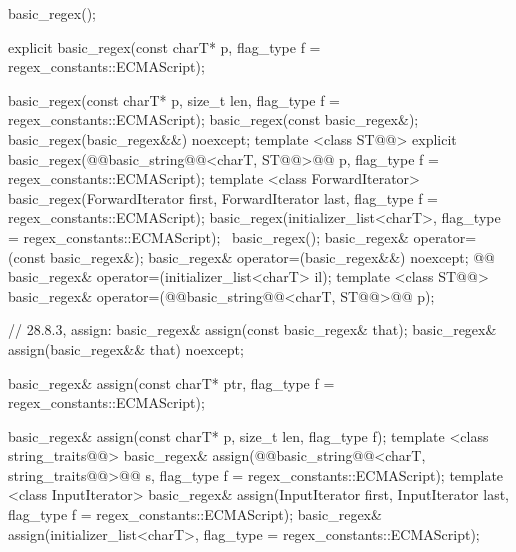 \documentclass[ebook,11pt,article]{memoir}
\begin{document}
\begin{codeblock}
    basic_regex();
\end{codeblock}
\begin{removedblock}
\begin{codeblock}
    explicit basic_regex(const charT* p,
      flag_type f = regex_constants::ECMAScript);
\end{codeblock}
\end{removedblock}
\begin{codeblock}                          
    basic_regex(const charT* p, size_t len, flag_type f = regex_constants::ECMAScript);
    basic_regex(const basic_regex&);
    basic_regex(basic_regex&&) noexcept;
    template <class ST@@>
      explicit basic_regex(@@basic_string@@<charT, ST@@>@\del{\&}@ p, 
                           flag_type f = regex_constants::ECMAScript);
    template <class ForwardIterator>
      basic_regex(ForwardIterator first, ForwardIterator last, 
                  flag_type f = regex_constants::ECMAScript);
    basic_regex(initializer_list<charT>,
      flag_type = regex_constants::ECMAScript);
    ~basic_regex();
    basic_regex& operator=(const basic_regex&);
    basic_regex& operator=(basic_regex&&) noexcept;
    @@
    basic_regex& operator=(initializer_list<charT> il);
    template <class ST@@>
      basic_regex& operator=(@@basic_string@@<charT, ST@@>@\del{\&}@ p);

    // 28.8.3, assign:
    basic_regex& assign(const basic_regex& that);
    basic_regex& assign(basic_regex&& that) noexcept;
\end{codeblock}
\begin{removedblock}
\begin{codeblock}
    basic_regex& assign(const charT* ptr,
      flag_type f = regex_constants::ECMAScript);
\end{codeblock}
\end{removedblock}
\begin{codeblock}                          
    basic_regex& assign(const charT* p, size_t len, flag_type f);
    template <class string_traits@@>
      basic_regex& assign(@@basic_string@@<charT, string_traits@@>@\del{\&}@ s,
                          flag_type f = regex_constants::ECMAScript);
    template <class InputIterator>
      basic_regex& assign(InputIterator first, InputIterator last,
                          flag_type f = regex_constants::ECMAScript);
    basic_regex& assign(initializer_list<charT>,
                        flag_type = regex_constants::ECMAScript);
\end{codeblock}
\end{document}
